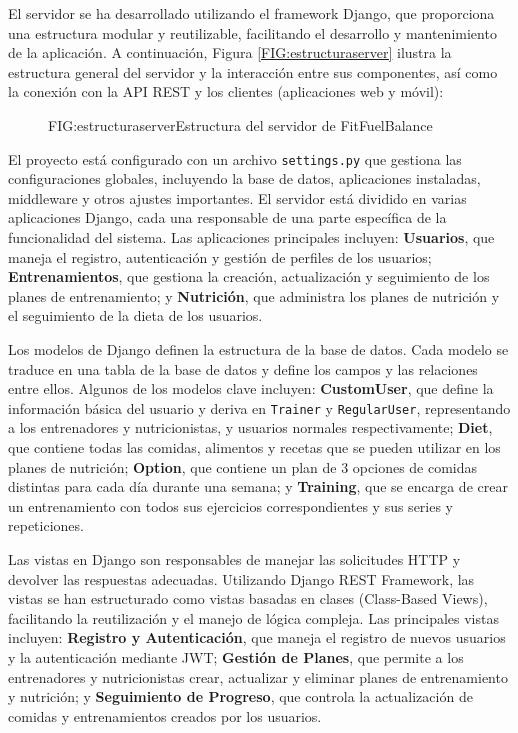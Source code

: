 El servidor se ha desarrollado utilizando el framework Django, que proporciona una estructura modular y reutilizable, facilitando el desarrollo y mantenimiento de la aplicación. A continuación, Figura \ref{FIG:estructuraserver} ilustra la estructura general del servidor y la interacción entre sus componentes, así como la conexión con la API REST y los clientes (aplicaciones web y móvil):

\begin{figure}[Distribución Estructura Servidor]{FIG:estructuraserver}{Estructura del servidor de FitFuelBalance}
\end{figure}

El proyecto está configurado con un archivo \texttt{settings.py}  que gestiona las configuraciones globales, incluyendo la base de datos, aplicaciones instaladas, middleware y otros ajustes importantes. El servidor está dividido en varias aplicaciones Django, cada una responsable de una parte específica de la funcionalidad del sistema. Las aplicaciones principales  incluyen: \textbf{Usuarios}, que maneja el registro, autenticación y gestión de perfiles de los usuarios; \textbf{Entrenamientos}, que gestiona la creación, actualización y seguimiento de los planes de entrenamiento; y \textbf{Nutrición}, que administra los planes de nutrición y el seguimiento de la dieta de los usuarios.

Los modelos de Django  definen la estructura de la base de datos. Cada modelo se traduce en una tabla de la base de datos y define los campos y las relaciones entre ellos. Algunos de los modelos clave incluyen: \textbf{CustomUser}, que define la información básica del usuario y deriva en \texttt{Trainer} y \texttt{RegularUser}, representando a los entrenadores y nutricionistas, y usuarios normales respectivamente; \textbf{Diet}, que contiene todas las comidas, alimentos y recetas que se pueden utilizar en los planes de nutrición; \textbf{Option}, que contiene un plan de 3 opciones de comidas distintas para cada día durante una semana; y \textbf{Training}, que se encarga de crear un entrenamiento con todos sus ejercicios correspondientes y sus series y repeticiones.

Las vistas en Django  son responsables de manejar las solicitudes HTTP y devolver las respuestas adecuadas. Utilizando Django REST Framework, las vistas se han estructurado como vistas basadas en clases (Class-Based Views), facilitando la reutilización y el manejo de lógica compleja. Las principales vistas incluyen: \textbf{Registro y Autenticación}, que maneja el registro de nuevos usuarios y la autenticación mediante JWT; \textbf{Gestión de Planes}, que permite a los entrenadores y nutricionistas crear, actualizar y eliminar planes de entrenamiento y nutrición; y \textbf{Seguimiento de Progreso}, que controla la actualización de comidas y entrenamientos creados por los usuarios.

